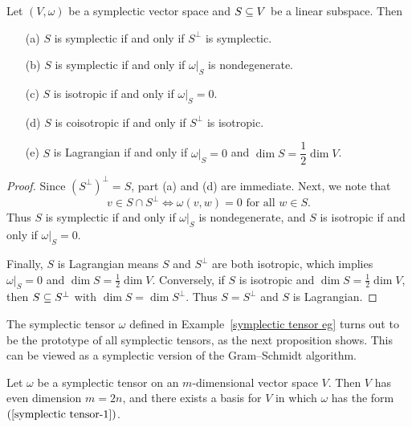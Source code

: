 \begin{proposition}\label{symplectic subspace iff}
Let $(V,\omega)$ be a symplectic vector space and $S\subseteq V$ be a linear subspace. Then
\begin{itemize}
\item[(a)] $S$ is symplectic if and only if $S^\bot$ is symplectic.
\item[(b)] $S$ is symplectic if and only if $\omega|_S$ is nondegenerate.
\item[(c)] $S$ is isotropic if and only if $\omega|_S=0$.
\item[(d)] $S$ is coisotropic if and only if $S^\bot$ is isotropic.
\item[(e)] $S$ is Lagrangian if and only if $\omega|_S=0$ and $\dim S=\dfrac{1}{2}\dim V$.
\end{itemize}
\end{proposition}
\begin{proof}
Since $(S^\bot)^\bot=S$, part (a) and (d) are immediate. Next, we note that
\[\text{$v\in S\cap S^\bot$}\iff\text{$\omega(v,w)=0$ for all $w\in S$}.\]
Thus $S$ is symplectic if and only if $\omega|_S$ is nondegenerate, and $S$ is isotropic if and only if $\omega|_S=0$.\par
Finally, $S$ is Lagrangian means $S$ and $S^\bot$ are both isotropic, which implies $\omega|_S=0$ and $\dim S=\frac{1}{2}\dim V$. Conversely, if $S$ is isotropic and $\dim S=\frac{1}{2}\dim V$, then
$S\subseteq S^\bot$ with $\dim S=\dim S^\bot$. Thus $S=S^\bot$ and $S$ is Lagrangian. 
\end{proof}
The symplectic tensor $\omega$ defined in Example~\ref{symplectic tensor eg} turns out to be the prototype of all symplectic tensors, as the next proposition shows. This can be viewed as a symplectic version of the Gram–Schmidt algorithm.
\begin{proposition}\label{symplectic tensor canonical form}
Let $\omega$ be a symplectic tensor on an $m$-dimensional vector space $V$. Then $V$ has even dimension $m=2n$, and there exists a basis for $V$ in which $\omega$ has the form $(\ref{symplectic tensor-1})$.
\end{proposition}
